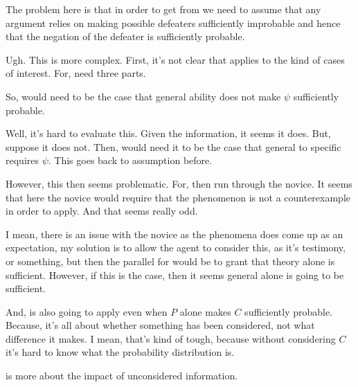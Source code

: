 \begin{note}
  \color{red}
  The problem here is that in order to get \nI{} from \wnf{} we need to assume that any argument relies on making possible defeaters sufficiently improbable and hence that the negation of the defeater is sufficiently probable.

  Ugh.
  This is more complex.
  First, it's not clear that \wnf{} applies to the kind of cases of interest.
  For, need three parts.

  So, would need to be the case that general ability does not make \(\psi\) sufficiently probable.

  Well, it's hard to evaluate this.
  Given the information, it seems it does.
  But, suppose it does not.
  Then, would need it to be the case that general to specific requires \(\psi\).
  This goes back to assumption before.

  However, this then seems problematic.
  For, then run through the novice.
  It seems that here the novice would require that the phenomenon is not a counterexample in order to apply.
  And that seems really odd.

  I mean, there is an issue with the novice as the phenomena does come up as an expectation, my solution is to allow the agent to consider this, as it's testimony, or something, but then the parallel for \wnf{} would be to grant that theory alone is sufficient.
  However, if this is the case, then it seems general alone is going to be sufficient.

  And, \nI{} is also going to apply even when \(P\) alone makes \(C\) sufficiently probable.
  Because, it's all about whether something has been considered, not what difference it makes.
  I mean, that's kind of tough, because without considering \(C\) it's hard to know what the probability distribution is.

  \nI{} is more about the impact of unconsidered information.
\end{note}

